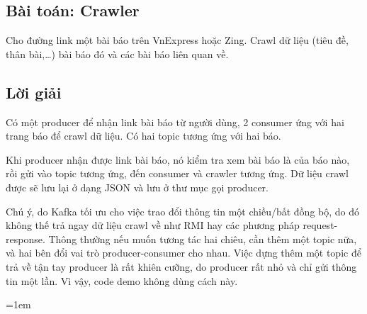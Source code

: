 \documentclass{article}
\begin{document}
\subsection{Bài toán: Crawler}

Cho đường link một bài báo trên VnExpress hoặc Zing. Crawl dữ liệu (tiêu đề,
thân bài,\ldots) bài báo đó và các bài báo liên quan về.

\subsection{Lời giải}

Có một producer để nhận link bài báo từ người dùng, 2 consumer ứng với hai trang
báo để crawl dữ liệu. Có hai topic tương ứng với hai báo.

Khi producer nhận được link bài báo, nó kiểm tra xem bài báo là của báo nào, rồi
gửi vào topic tương ứng, đến consumer và crawler tương ứng. Dữ liệu crawl được
sẽ lưu lại ở dạng JSON và lưu ở thư mục gọi producer.

Chú ý, do Kafka tối ưu cho việc trao đổi thông tin một chiều/bất đồng bộ, do đó
không thế trả ngay dữ liệu crawl về như RMI hay các phương pháp
request-response. Thông thường nếu muốn tương tác hai chiêu, cần thêm một topic
nữa, và hai bên đổi vai trò producer-consumer cho nhau. Việc dựng thêm một topic
để trả về tận tay producer là rất khiên cưỡng, do producer rất nhỏ và chỉ gửi
thông tin một lần. Vì vậy, code demo không dùng cách này.

\emergencystretch=1em
\printbibliography[title={Tài liệu tham khảo}]
\end{document}
